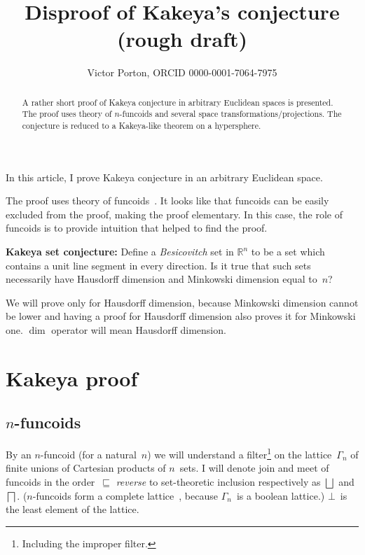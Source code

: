\documentclass[oneside,draft]{amsart}
\title{Disproof of Kakeya's conjecture (rough draft)}
\author{Victor Porton, ORCID 0000-0001-7064-7975}
\begin{document}

\begin{abstract}
A rather short proof of Kakeya conjecture in arbitrary Euclidean spaces is presented. The proof uses theory of $n$-fun\-co\-ids and several space transformations/projections. The conjecture is reduced to a Ka\-ke\-ya-li\-ke theorem on a hypersphere.
\end{abstract}

\maketitle  

In this article, I prove Kakeya conjecture in an arbitrary Euclidean space.

The proof uses theory of funcoids~\cite{volume-1}. It looks like that funcoids can be easily excluded from the proof, making the proof elementary. In this case, the role of funcoids is to provide intuition that helped to find the proof.

\textbf{Kakeya set conjecture:} \cite{kakeya-long,tao-blog-kakeya} Define a \emph{Besicovitch} set in $\mathbb{R}^n$ to be a set which contains a unit line segment in every direction. Is it true that such sets necessarily have Hausdorff dimension and Minkowski dimension equal to~$n$?

We will prove only for Hausdorff dimension, because Minkowski dimension cannot be lower and having a proof for Hausdorff dimension also proves it for Minkowski one. $\dim$ operator will mean Hausdorff dimension.

\section{Kakeya proof}

\subsection{$n$-fun\-co\-ids}

By an $n$-fun\-co\-id (for a natural~$n$) we will understand a filter\footnote{Including the improper filter.} on the lattice~$\Gamma_n$ of finite unions of Cartesian products of $n$~sets. I will denote join and meet of funcoids in the order~$\sqsubseteq$ \emph{reverse} to set-the\-o\-re\-tic inclusion respectively as $\bigsqcup$ and $\bigsqcap$. ($n$-fun\-co\-ids form a complete lattice~\cite{volume-1}, because $\Gamma_n$~is a boolean lattice.) $\bot$~is the least element of the lattice.
\end{document}
